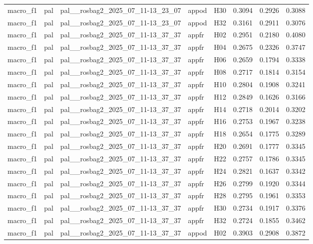 \begin{table}[tbp]
\begin{tabular}{lllllrrr}
macro\_f1 & pal & pal\_\_rosbag2\_2025\_07\_11-13\_23\_07 & appod & H30 & 0.3094 & 0.2926 & 0.3088 \\
macro\_f1 & pal & pal\_\_rosbag2\_2025\_07\_11-13\_23\_07 & appod & H32 & 0.3161 & 0.2911 & 0.3076 \\
macro\_f1 & pal & pal\_\_rosbag2\_2025\_07\_11-13\_37\_37 & appfr & H02 & 0.2951 & 0.2180 & 0.4080 \\
macro\_f1 & pal & pal\_\_rosbag2\_2025\_07\_11-13\_37\_37 & appfr & H04 & 0.2675 & 0.2326 & 0.3747 \\
macro\_f1 & pal & pal\_\_rosbag2\_2025\_07\_11-13\_37\_37 & appfr & H06 & 0.2659 & 0.1794 & 0.3338 \\
macro\_f1 & pal & pal\_\_rosbag2\_2025\_07\_11-13\_37\_37 & appfr & H08 & 0.2717 & 0.1814 & 0.3154 \\
macro\_f1 & pal & pal\_\_rosbag2\_2025\_07\_11-13\_37\_37 & appfr & H10 & 0.2804 & 0.1908 & 0.3241 \\
macro\_f1 & pal & pal\_\_rosbag2\_2025\_07\_11-13\_37\_37 & appfr & H12 & 0.2849 & 0.1626 & 0.3166 \\
macro\_f1 & pal & pal\_\_rosbag2\_2025\_07\_11-13\_37\_37 & appfr & H14 & 0.2718 & 0.2014 & 0.3202 \\
macro\_f1 & pal & pal\_\_rosbag2\_2025\_07\_11-13\_37\_37 & appfr & H16 & 0.2753 & 0.1967 & 0.3238 \\
macro\_f1 & pal & pal\_\_rosbag2\_2025\_07\_11-13\_37\_37 & appfr & H18 & 0.2654 & 0.1775 & 0.3289 \\
macro\_f1 & pal & pal\_\_rosbag2\_2025\_07\_11-13\_37\_37 & appfr & H20 & 0.2691 & 0.1777 & 0.3345 \\
macro\_f1 & pal & pal\_\_rosbag2\_2025\_07\_11-13\_37\_37 & appfr & H22 & 0.2757 & 0.1786 & 0.3345 \\
macro\_f1 & pal & pal\_\_rosbag2\_2025\_07\_11-13\_37\_37 & appfr & H24 & 0.2821 & 0.1637 & 0.3342 \\
macro\_f1 & pal & pal\_\_rosbag2\_2025\_07\_11-13\_37\_37 & appfr & H26 & 0.2799 & 0.1920 & 0.3344 \\
macro\_f1 & pal & pal\_\_rosbag2\_2025\_07\_11-13\_37\_37 & appfr & H28 & 0.2795 & 0.1961 & 0.3353 \\
macro\_f1 & pal & pal\_\_rosbag2\_2025\_07\_11-13\_37\_37 & appfr & H30 & 0.2734 & 0.1917 & 0.3376 \\
macro\_f1 & pal & pal\_\_rosbag2\_2025\_07\_11-13\_37\_37 & appfr & H32 & 0.2724 & 0.1855 & 0.3462 \\
macro\_f1 & pal & pal\_\_rosbag2\_2025\_07\_11-13\_37\_37 & appod & H02 & 0.3903 & 0.2908 & 0.3872 \\

\end{tabular}
\end{table}
